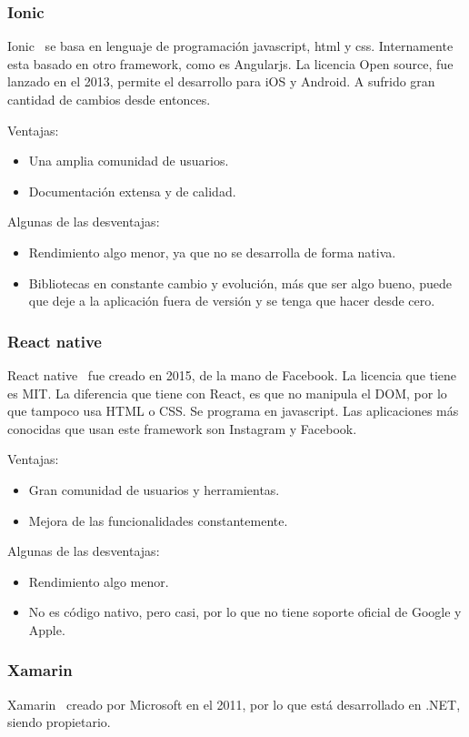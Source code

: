 \subsubsection{Ionic}
Ionic~\cite{wiki:ionnic} se basa en lenguaje de programación javascript, html y css. Internamente esta basado en otro framework, como es Angularjs. La licencia Open source, fue lanzado en el 2013, permite el desarrollo para iOS y Android. A sufrido gran cantidad de cambios desde entonces.

Ventajas:
\begin{itemize}
	\item Una amplia comunidad de usuarios.
	\item Documentación extensa y de calidad.
\end{itemize}

Algunas de las desventajas:
\begin{itemize}
	\item Rendimiento algo menor, ya que no se desarrolla de forma nativa.
	\item Bibliotecas en constante cambio y evolución, más que ser algo bueno, puede que deje a la aplicación fuera de versión y se tenga que hacer desde cero.
\end{itemize}

\subsubsection{React native}
React native~\cite{wiki:react} fue creado en 2015, de la mano de Facebook. La licencia que tiene es MIT. La diferencia que tiene con React, es que no manipula el DOM, por lo que tampoco usa HTML o CSS. 
Se programa en javascript. Las aplicaciones más conocidas que usan este framework son Instagram y Facebook.

Ventajas:
\begin{itemize}
	\item Gran comunidad de usuarios y herramientas.
	\item Mejora de las funcionalidades constantemente.
\end{itemize}

Algunas de las desventajas:
\begin{itemize}
	\item Rendimiento algo menor.
	\item No es código nativo, pero casi, por lo que no tiene soporte oficial de Google y Apple.
\end{itemize}

\subsubsection{Xamarin}
Xamarin~\cite{wiki:xamarin} creado por Microsoft en el 2011, por lo que está desarrollado en .NET, siendo propietario.

